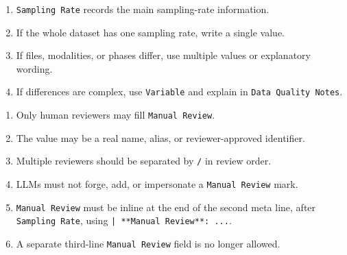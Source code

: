 \begin{tcolorbox}
\begin{enumerate}[leftmargin=1.5em,noitemsep,topsep=2pt]
\item \texttt{Sampling Rate} records the main sampling-rate information.
\item If the whole dataset has one sampling rate, write a single value.
\item If files, modalities, or phases differ, use multiple values or explanatory wording.
\item If differences are complex, use \texttt{Variable} and explain in \texttt{Data Quality Notes}.
\end{enumerate}

\smallskip{}\par\smallskip

\begin{enumerate}[leftmargin=1.5em,noitemsep,topsep=2pt]
\item Only human reviewers may fill \texttt{Manual Review}.
\item The value may be a real name, alias, or reviewer-approved identifier.
\item Multiple reviewers should be separated by \texttt{/} in review order.
\item LLMs must not forge, add, or impersonate a \texttt{Manual Review} mark.
\item \texttt{Manual Review} must be inline at the end of the second meta line, after \texttt{Sampling Rate}, using \texttt{| **Manual Review**: ...}.
\item A separate third-line \texttt{Manual Review} field is no longer allowed.
\end{enumerate}

\smallskip{}\par\smallskip


\end{tcolorbox}
